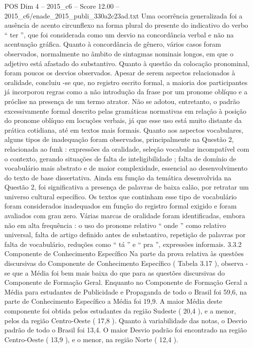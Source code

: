 \begin{textsample}{POS Dim 4 – 2015\_c6 – Score 12.00 – 2015\_c6/enade\_2015\_publi\_330a2c23ad.txt}
Uma ocorrência generalizada foi a ausência de acento circunflexo na forma plural do presente do indicativo do verbo “ ter ”, que foi considerada como um desvio na concordância verbal e não na acentuação gráfica.
Quanto à concordância de gênero, vários casos foram observados, normalmente no âmbito de sintagmas nominais longos, em que o adjetivo está afastado do substantivo.
Quanto à questão da colocação pronominal, foram poucos os desvios observados.
Apesar de serem aspectos relacionados à oralidade, concluiu -se que, no registro escrito formal, a maioria dos participantes já incorporou regras como a não introdução da frase por um pronome oblíquo e a próclise na presença de um termo atrator.
Não se adotou, entretanto, o padrão excessivamente formal descrito pelas gramáticas normativas em relação à posição do pronome oblíquo em locuções verbais, já que esse uso está muito distante da prática cotidiana, até em textos mais formais.
Quanto aos aspectos vocabulares, alguns tipos de inadequação foram observados, principalmente na Questão 2, relacionada ao funk : expressões da oralidade, seleção vocabular incompatível com o contexto, gerando situações de falta de inteligibilidade ; falta de domínio de vocabulário mais abstrato e de maior complexidade, essencial ao desenvolvimento do texto de base dissertativa.
Ainda em função da temática desenvolvida na Questão 2, foi significativa a presença de palavras de baixa calão, por retratar um universo cultural específico.
Os textos que continham esse tipo de vocabulário foram considerados inadequados em função do registro formal exigido e foram avaliados com grau zero.
Várias marcas de oralidade foram identificadas, embora não em alta frequência : o uso do pronome relativo “ onde ” como relativo universal, falta de artigo definido antes de substantivo, repetição de palavras por falta de vocabulário, reduções como “ tá ” e “ pra ”, expressões informais. 3.3.2 Componente de Conhecimento Específico Na parte da prova relativa às questões discursivas do Componente de Conhecimento Específico ( Tabela 3.17 ), observa -se que a Média foi bem mais baixa do que para as questões discursivas do Componente de Formação Geral.
Enquanto no Componente de Formação Geral a Média para estudantes de Publicidade e Propaganda de todo o Brasil foi 59,6, na parte de Conhecimento Específico a Média foi 19,9.
A maior Média deste componente foi obtida pelos estudantes da região Sudeste ( 20,4 ), e a menor, pelos da região Centro-Oeste ( 17,8 ).
Quanto à variabilidade das notas, o Desvio padrão de todo o Brasil foi 13,4.
O maior Desvio padrão foi encontrado na região Centro-Oeste ( 13,9 ), e o menor, na região Norte ( 12,4 ).

\end{textsample}
